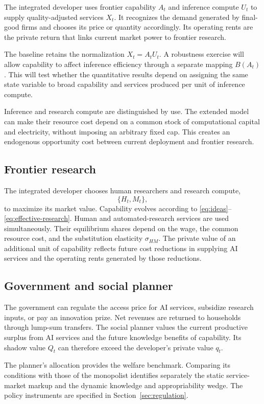 The integrated developer uses frontier capability $A_t$ and inference compute $U_t$
to supply quality-adjusted services $X_t$. It recognizes the demand generated by
final-good firms and chooses its price or quantity accordingly. Its operating rents
are the private return that links current market power to frontier research.

The baseline retains the normalization $X_t=A_tU_t$. A robustness exercise will allow
capability to affect inference efficiency through a separate mapping $B(A_t)$. This
will test whether the quantitative results depend on assigning the same state
variable to broad capability and services produced per unit of inference compute.

Inference and research compute are distinguished by use. The extended model can make
their resource cost depend on a common stock of computational capital and electricity,
without imposing an arbitrary fixed cap. This creates an endogenous opportunity cost
between current deployment and frontier research.

\subsection{Frontier research}

The integrated developer chooses human researchers and research compute,
\[
    \{H_t,M_t\},
\]
to maximize its market value. Capability evolves according to
\eqref{eq:ideas}--\eqref{eq:effective-research}. Human and automated-research
services are used simultaneously. Their equilibrium shares depend on the wage, the
common resource cost, and the substitution elasticity $\sigma_{HM}$. The private value of
an additional unit of capability reflects future cost reductions in supplying AI
services and the operating rents generated by those reductions.

\subsection{Government and social planner}

The government can regulate the access price for AI services, subsidize research
inputs, or pay an innovation prize. Net revenues are returned to households through
lump-sum transfers. The social planner values the current productive surplus from AI
services and the future knowledge benefits of capability. Its shadow value $Q_t$ can
therefore exceed the developer's private value $q_t$.

The planner's allocation provides the welfare benchmark. Comparing its conditions
with those of the monopolist identifies separately the static service-market markup
and the dynamic knowledge and appropriability wedge. The policy instruments are
specified in Section~\ref{sec:regulation}.

